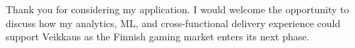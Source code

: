 \documentclass[11pt, a4paper]{awesome-cv}
\begin{document}
\begin{cvletter}
Thank you for considering my application. I would welcome the opportunity to discuss how my analytics, ML, and cross-functional delivery experience could support Veikkaus as the Finnish gaming market enters its next phase.

\end{cvletter}


\makeletterclosing
\end{document}
